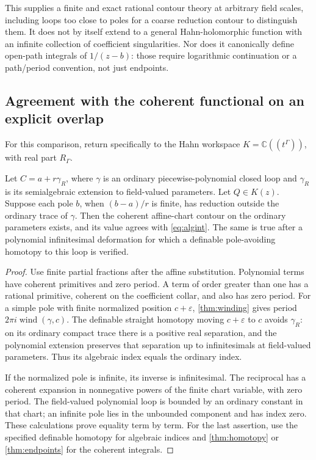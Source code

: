 \documentclass[11pt,letterpaper]{article}
\theoremstyle{definition}
\theoremstyle{remark}
\newcommand{\C}{\mathbb C}\newcommand{\R}{\mathbb R}\newcommand{\Q}{\mathbb Q}\newcommand{\Z}{\mathbb Z}\newcommand{\N}{\mathbb N}
\newcommand{\wind}{\operatorname{wind}}\newcommand{\Ind}{\operatorname{Ind}}\newcommand{\id}{\operatorname{id}}
\numberwithin{equation}{section}
\begin{document}
This supplies a finite and exact rational contour theory at arbitrary field scales, including loops too close to poles for a coarse reduction contour to distinguish them. It does not by itself extend to a general Hahn-holomorphic function with an infinite collection of coefficient singularities. Nor does it canonically define open-path integrals of $1/(z-b)$: those require logarithmic continuation or a path/period convention, not just endpoints.

\subsection{Agreement with the coherent functional on an explicit overlap}
For this comparison, return specifically to the Hahn workspace $K=\C((t^\Gamma))$, with real part $R_\Gamma$.
\begin{proposition}\label{prop:overlap}
Let $C=a+r\gamma_R$, where $\gamma$ is an ordinary piecewise-polynomial closed loop and $\gamma_R$ is its semialgebraic extension to field-valued parameters. Let $Q\in K(z)$. Suppose each pole $b$, when $(b-a)/r$ is finite, has reduction outside the ordinary trace of $\gamma$. Then the coherent affine-chart contour on the ordinary parameters exists, and its value agrees with \eqref{eq:algint}. The same is true after a polynomial infinitesimal deformation for which a definable pole-avoiding homotopy to this loop is verified.
\end{proposition}
\begin{proof}
Use finite partial fractions after the affine substitution. Polynomial terms have coherent primitives and zero period. A term of order greater than one has a rational primitive, coherent on the coefficient collar, and also has zero period. For a simple pole with finite normalized position $c+\varepsilon$, \cref{thm:winding} gives period $2\pi i\wind(\gamma,c)$. The definable straight homotopy moving $c+\varepsilon$ to $c$ avoids $\gamma_R$: on its ordinary compact trace there is a positive real separation, and the polynomial extension preserves that separation up to infinitesimals at field-valued parameters. Thus its algebraic index equals the ordinary index.

If the normalized pole is infinite, its inverse is infinitesimal. The reciprocal has a coherent expansion in nonnegative powers of the finite chart variable, with zero period. The field-valued polynomial loop is bounded by an ordinary constant in that chart; an infinite pole lies in the unbounded component and has index zero. These calculations prove equality term by term. For the last assertion, use the specified definable homotopy for algebraic indices and \cref{thm:homotopy} or \cref{thm:endpoints} for the coherent integrals.
\end{proof}
\end{document}
